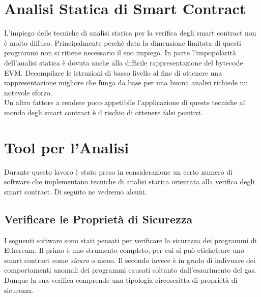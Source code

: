 \section{Analisi Statica di Smart Contract}

L'impiego delle tecniche di analisi statica per la verifica degli smart contract non è molto diffuso. Principalmente perchè data la dimensione limitata di questi programmi non si ritiene necessario il suo impiego.\newline
\indent In parte l'impopolarità dell'analisi statica è dovuta anche alla difficile rappresentazione del bytecode EVM. Decompilare le istruzioni di basso livello al fine di ottenere una rappresentazione migliore che funga da base per una buona analisi richiede un notevole sforzo.\\
\indent Un altro fattore a rendere poco appetibile l'applicazione di queste tecniche al mondo degli smart contract è il rischio di ottenere falsi positivi.\newline

\section{Tool per l'Analisi}
Durante questo lavoro è stato preso in considerazione un certo numero di software che implementano tecniche di analisi statica orientata alla verifica degli smart contract. Di seguito ne vedremo alcuni.

\subsection{Verificare le Proprietà di Sicurezza}

I seguenti software sono stati pensati per verificare la sicurezza dei programmi di Ethereum.\newline
\indent Il primo è uno strumento completo, per cui si può etichettare uno smart contract come \emph{sicuro} o meno. Il secondo invece è in grado di indivuare dei comportamenti anomali dei programmi causati soltanto dall'esaurimento del gas. Dunque la sua verifica comprende una tipologia circoscritta di proprietà di sicurezza.\newline

